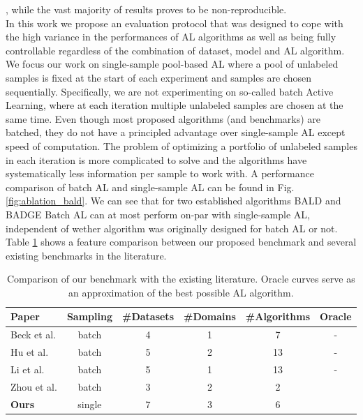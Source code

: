 \documentclass[]{article}
\begin{document}
, while the vast majority of results proves to be non-reproducible. \\
In this work we propose an evaluation protocol that was designed to cope with the high variance in the performances of AL algorithms as well as being fully controllable regardless of the combination of dataset, model and AL algorithm.\\
We focus our work on single-sample pool-based AL where a pool of unlabeled samples is fixed at the start of each experiment and samples are chosen sequentially.
Specifically, we are not experimenting on so-called batch Active Learning, where at each iteration multiple unlabeled samples are chosen at the same time.
Even though most proposed algorithms (and benchmarks) are batched, they do not have a principled advantage over single-sample AL except speed of computation.
The problem of optimizing a portfolio of unlabeled samples in each iteration is more complicated to solve and the algorithms have systematically less information per sample to work with.
A performance comparison of batch AL and single-sample AL can be found in Fig. \ref{fig:ablation_bald}.
We can see that for two established algorithms BALD \cite{krizhevsky2009learning} and BADGE \cite{ashdeep} Batch AL can at most perform on-par with single-sample AL, independent of wether algorithm was originally designed for batch AL or not. \\
Table \ref{tab:benchmark_comparison} shows a feature comparison between our proposed benchmark and several existing benchmarks in the literature.
\begin{table}
	\centering
	\begin{tabular}{l | c c c c c}
		Paper & Sampling & \#Datasets & \#Domains & \#Algorithms & Oracle \\
		\hline
		Beck et al. \cite{beck2021effective} & batch & 4 & 1 & 7 & - \\
		Hu et al. \cite{hu2021towards} & batch & 5 & 2 & 13 & - \\
		Li et al. \cite{li2022empirical} & batch & 5 & 1 & 13 & - \\
		Zhou et al. \cite{zhou2021towards} & batch & 3 & 2 & 2 & \checkmark \\
		\textbf{Ours} & single & 7 & 3 & 6 & \checkmark 
	\end{tabular}
	\caption{Comparison of our benchmark with the existing literature. Oracle curves serve as an approximation of the best possible AL algorithm.}
	\label{tab:benchmark_comparison}
\end{table}
\end{document}
